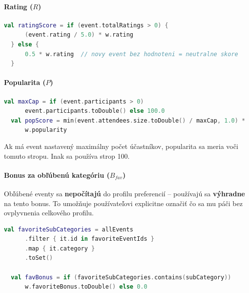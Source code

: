   \paragraph{Rating ($R$)}

  \begin{lstlisting}[language=Kotlin, caption=Výpočet skóre ratingu]
  val ratingScore = if (event.totalRatings > 0) {
      (event.rating / 5.0) * w.rating
  } else {
      0.5 * w.rating  // novy event bez hodnoteni = neutralne skore
  }
  \end{lstlisting}

  \paragraph{Popularita ($P$)}

  \begin{lstlisting}[language=Kotlin, caption=Výpočet skóre popularity]
  val maxCap = if (event.participants > 0)
      event.participants.toDouble() else 100.0
  val popScore = min(event.attendees.size.toDouble() / maxCap, 1.0) *
      w.popularity
  \end{lstlisting}

  Ak má event nastavený maximálny počet účastníkov, popularita sa meria
  voči tomuto stropu. Inak sa používa strop 100.

  \paragraph{Bonus za obľúbenú kategóriu ($B_{fav}$)}

  Obľúbené eventy sa \textbf{nepočítajú} do profilu preferencií --
  používajú sa \textbf{výhradne} na tento bonus. To umožňuje používateľovi
  explicitne označiť čo sa mu páči bez ovplyvnenia celkového profilu.

  \begin{lstlisting}[language=Kotlin, caption=Výpočet bonusu za obľúbenú kategóriu]
  val favoriteSubCategories = allEvents
      .filter { it.id in favoriteEventIds }
      .map { it.category }
      .toSet()

  val favBonus = if (favoriteSubCategories.contains(subCategory))
      w.favoriteBonus.toDouble() else 0.0
  \end{lstlisting}

